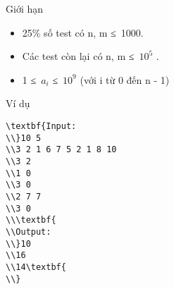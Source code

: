 Giới hạn  
\begin{itemize}
	\item     25\% số test có n, m ≤ 1000.   
	\item     Các test còn lại có n, m ≤ $10^{5}$    .   
	\item     1 ≤ $a_{i}$    ≤ $10^{9}$    (với i từ 0 đến n - 1)   
\end{itemize}
   Ví dụ  
\begin{verbatim}
\textbf{Input:
\\}10 5
\\3 2 1 6 7 5 2 1 8 10
\\3 2
\\1 0
\\3 0
\\2 7 7
\\3 0
\\\textbf{
\\Output:
\\}10
\\16
\\14\textbf{
\\}\end{verbatim}